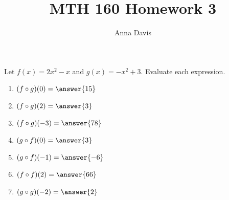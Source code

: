\documentclass{ximera}
\author{Anna Davis} \title{MTH 160 Homework 3}
\begin{document}
\begin{abstract}

\end{abstract}
\maketitle
 

\begin{problem}\label{prob:160hom2prob6}
Let $f(x)=2x^2-x$ and $g(x)=-x^2+3$.  Evaluate each expression.
\begin{enumerate}
    \item $(f\circ g)(0)=\answer{15}$
    \item $(f\circ g)(2)=\answer{3}$
    \item $(f\circ g)(-3)=\answer{78}$
    \item $(g\circ f)(0)=\answer{3}$
    \item $(g\circ f)(-1)=\answer{-6}$
    \item $(f\circ f)(2)=\answer{66}$
    \item $(g\circ g)(-2)=\answer{2}$
\end{enumerate}
\end{problem}
\end{document}
